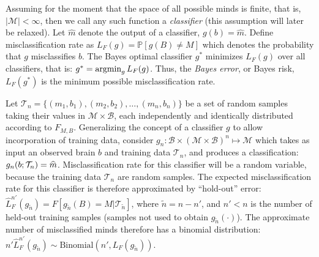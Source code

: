\documentclass{article}
\newcommand{\mB}{\mathcal{B}}
\newcommand{\mM}{\mathcal{M}}
\newcommand{\PP}{\mathbb{P}}           %
\providecommand{\mc}[1]{\mathcal{#1}}
\providecommand{\mh}[1]{\widehat{#1}}
\providecommand{\mt}[1]{\widetilde{#1}}
\newcommand{\argmin}{\operatornamewithlimits{argmin}}
\newcommand{\hL}{\widehat{L}}
\providecommand{\tr}[1]{\textcolor{black}{#1}}
\begin{document}




Assuming for the moment that the space of all possible minds is finite, that is, $|\mM| < \infty$, then we call any such function a \emph{classifier} (this assumption will later be relaxed).  Let $\mh{m}$ denote the output of a classifier, $g(b)=\mh{m}$.  Define misclassification rate as $L_{F}(g) = \PP[g(B) \neq M]$ which denotes the probability that $g$ misclassifies $b$. The Bayes optimal classifier $g^*$ minimizes $L_{F}(g)$ over all classifiers, that is:	
$g^* = \argmin_{g} L_{F}(g)$.
Thus, the \emph{Bayes error}, or Bayes risk, $L_{F}(g^*)$ is the minimum possible misclassification rate.

Let $\mc{T}_n=\{(m_1,b_1), (m_2,b_2), \ldots, (m_n,b_n)\}$ be a set of random samples taking their values in $\mc{M} \times \mc{B}$, each independently and identically distributed according to $F_{M,B}$.  Generalizing the concept of a classifier $g$ to allow incorporation of training data, consider $g_n:\mB \times (\mc{M} \times \mc{B})^n \mapsto \mM$ which takes as input an observed brain  $b$ and training data $\mc{T}_n$, and produces a classification: $g_n(b;\tr{\mc{T}_n})=\mh{m}$.  Misclassification rate for this classifier will be a random variable, because the training data $\mc{T}_n$ are random samples.  The expected misclassification rate for this classifier is therefore approximated by ``hold-out'' error:
$\hL^{n'}_{F}(g_{\mt{n}}) = F[g_{\mt{n}}(B)=M | \mc{T}_{\mt{n}}]$,
where $\mt{n}=n-n'$, and $n'<n$ is the number of held-out training samples (samples not used to obtain $g_{\mt{n}}(\cdot)$).
The approximate  number of misclassified minds therefore has a binomial distribution:  $n' \hL^{n'}_{F}(g_{\mt{n}}) \sim \text{Binomial}(n',L_{F}(g_{\mt{n}}))$.
\end{document}
